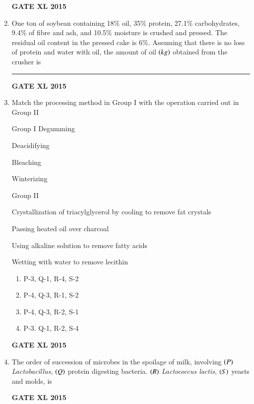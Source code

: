 \documentclass[journal,12pt,onecolumn]{IEEEtran}
\begin{document}
\begin{enumerate}
\hfill{\textbf{GATE XL 2015}}

\item One ton of soybean containing 18\% oil, 35\% protein, 27.1\% carbohydrates, 9.4\% of fibre and ash, and 10.5\% moisture is crushed and pressed. The residual oil content in the pressed cake is 6\%. Assuming that there is no loss of protein and water with oil, the amount of oil $\left(kg\right)$ obtained from the crusher is \rule{1cm}{0.15mm}
\hfill{\textbf{GATE XL 2015}}
\item  Match the processing method in Group I with the operation carried out in Group II

	\begin{minipage}{0.5\textwidth}\begin{flushleft}
	Group I
 Degumming

 Deacidifying

 Bleaching

 Winterizing

	\end{flushleft}
	\end{minipage}
	\begin{minipage}{0.5\textwidth}\begin{flushleft}
Group II

 Crystallization of triacylglycerol by cooling to remove fat crystals

 Passing heated oil over charcoal

 Using alkaline solution to remove fatty acids

 Wetting with water to remove lecithin
	\end{flushleft}
	\end{minipage}
    \begin{enumerate}
            \item P-3, Q-1, R-4, S-2
	    \item P-4, Q-3, R-1, S-2
	    \item P-4, Q-3, R-2, S-1
            \item P-3. Q-1, R-2, S-4
    \end{enumerate}
\hfill{\textbf{GATE XL 2015}}
\item The order of succession of microbes in the spoilage of milk, involving $\left(P\right)$ \textit{Lactobacillus}, $\left(Q\right)$ protein digesting bacteria. $\left(R\right)$ \textit{Lactococcus lactis}, $\left(S\right)$ yeasts and molds, is
    \begin{enumerate}
	\begin{multicols}{4}
            \item $S>R>Q>P$
	    \item $S>Q>R>P$
	    \item $R>P>S>Q$
            \item $Q>S>P>R$
	\end{multicols}
    \end{enumerate}
\hfill{\textbf{GATE XL 2015}}


\end{enumerate}
\end{document}
